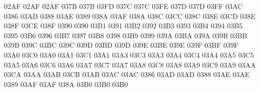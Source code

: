 \setcclcucx 02AF 02AF 02AF %
\setcclcucx 037B 037B 03FD %
\setcclcucx 037C 037C 03FE %
\setcclcucx 037D 037D 03FF %
 03AC 0386 %
 03AD 0388 %
 03AE 0389 %
\setcclcucx 038A 03AF 038A %
\setcclcucx 038C 03CC 038C %
\setcclcucx 038E 03CD 038E %
\setcclcucx 038F 03CE 038F %
 0390 0390 %
 03B1 0391 %
 03B2 0392 %
 03B3 0393 %
 03B4 0394 %
 03B5 0395 %
 03B6 0396 %
 03B7 0397 %
 03B8 0398 %
 03B9 0399 %
\setcclcucx 039A 03BA 039A %
\setcclcucx 039B 03BB 039B %
\setcclcucx 039C 03BC 039C %
\setcclcucx 039D 03BD 039D %
\setcclcucx 039E 03BE 039E %
\setcclcucx 039F 03BF 039F %
\setcclcucx 03A0 03C0 03A0 %
\setcclcucx 03A1 03C1 03A1 %
\setcclcucx 03A3 03C3 03A3 %
\setcclcucx 03A4 03C4 03A4 %
\setcclcucx 03A5 03C5 03A5 %
\setcclcucx 03A6 03C6 03A6 %
\setcclcucx 03A7 03C7 03A7 %
\setcclcucx 03A8 03C8 03A8 %
\setcclcucx 03A9 03C9 03A9 %
\setcclcucx 03AA 03CA 03AA %
\setcclcucx 03AB 03CB 03AB %
\setcclcucx 03AC 03AC 0386 %
\setcclcucx 03AD 03AD 0388 %
\setcclcucx 03AE 03AE 0389 %
\setcclcucx 03AF 03AF 038A %
\setcclcucx 03B0 03B0 03B0 %
